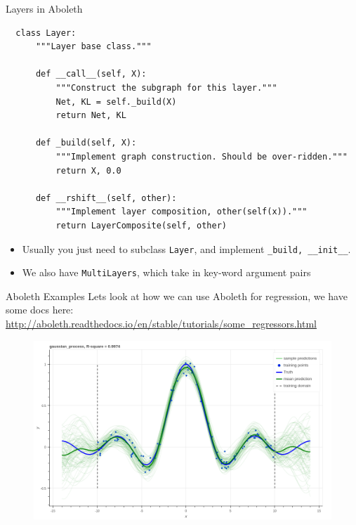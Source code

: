 \documentclass[lualatex, aspectratio=169]{beamer}
\begin{document}
\begin{frame}[fragile]{Layers in Aboleth}

  \begin{verbatim}
  class Layer:
      """Layer base class."""

      def __call__(self, X):
          """Construct the subgraph for this layer."""
          Net, KL = self._build(X)
          return Net, KL

      def _build(self, X):
          """Implement graph construction. Should be over-ridden."""
          return X, 0.0

      def __rshift__(self, other):
          """Implement layer composition, other(self(x))."""
          return LayerComposite(self, other)

  \end{verbatim}

  \begin{itemize}
    \item Usually you just need to subclass \texttt{Layer}, and implement \texttt{\_build, \_\_init\_\_}.
    \item We also have \texttt{MultiLayers}, which take in key-word argument pairs
  \end{itemize}
\end{frame}


\begin{frame}{Aboleth Examples}
  Lets look at how we can use Aboleth for regression, we have some docs here:
  \url{http://aboleth.readthedocs.io/en/stable/tutorials/some_regressors.html}

  \begin{figure}
    \includegraphics[width=0.6\pagewidth]{assets/gpr.png}
  \end{figure}

\end{frame}
\end{document}
